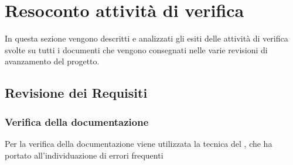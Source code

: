 \section{Resoconto attività di verifica}
In questa sezione vengono descritti e analizzati gli esiti delle attività di verifica svolte su tutti i documenti che vengono consegnati nelle varie revisioni di avanzamento del progetto.
	\subsection{Revisione dei Requisiti}
		\subsubsection{Verifica della documentazione}
		Per la verifica della documentazione viene utilizzata la tecnica del , che ha portato all'individuazione di errori frequenti